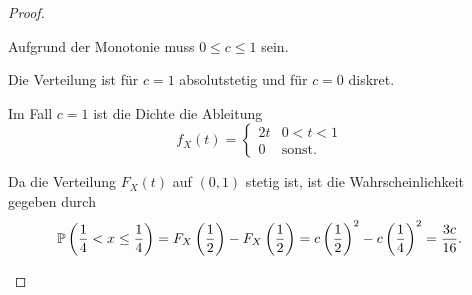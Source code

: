 \begin{proof}
	\begin{parts}
		\item Aufgrund der Monotonie muss $0 \le c \le 1$ sein. 
		\item Die Verteilung ist f\"{u}r $c=1$ absolutstetig und f\"{u}r $c=0$ diskret.
		
		Im Fall $c=1$ ist die Dichte die Ableitung
		\[f_X(t)=\begin{cases}
			2t & 0 < t < 1\\
			0 & \text{sonst.}
		\end{cases}\]
	\item \noindent
	
		\begin{center}
	\end{center}
Da die Verteilung $F_X(t)$ auf $(0,1)$ stetig ist, ist die Wahrscheinlichkeit gegeben durch
\[\mathbb{P}\left(\frac 14< x \le \frac 14 \right)=F_X\left(\frac 12 \right) - F_X\left(\frac 12\right) = c\left(\frac 12\right)^2 - c\left(\frac 14\right)^2=\frac{3c}{16}.\qedhere\]
	\end{parts}
\end{proof}